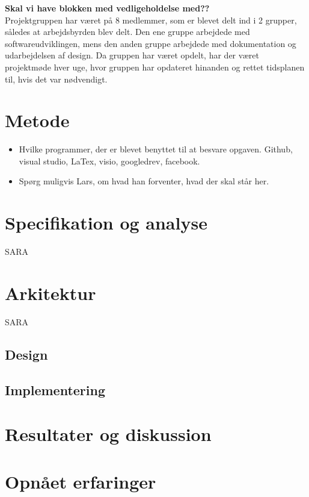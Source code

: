 \textbf{Skal vi have blokken med vedligeholdelse med??}\\
Projektgruppen har været på 8 medlemmer, som er blevet delt ind i 2 grupper, således at arbejdsbyrden blev delt. Den ene gruppe arbejdede med softwareudviklingen, mens den anden gruppe arbejdede med dokumentation og udarbejdelsen af design. Da gruppen har været opdelt, har der været projektmøde hver uge, hvor gruppen har opdateret hinanden og rettet tidsplanen til, hvis det var nødvendigt.


\section{Metode}

\begin{itemize}
	\item Hvilke programmer, der er blevet benyttet til at besvare opgaven. Github, visual studio, LaTex, visio, googledrev, facebook. 
	\item Spørg muligvis Lars, om hvad han forventer, hvad der skal står her. 
\end{itemize}

\section{Specifikation og analyse}
SARA

\section{Arkitektur}
SARA

\subsection{Design}

\subsection{Implementering}

\section{Resultater og diskussion}

\section{Opnået erfaringer}


